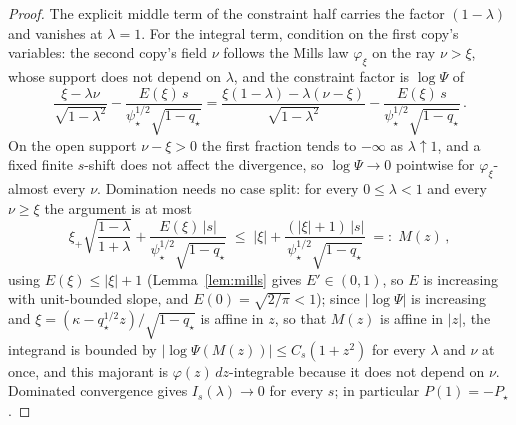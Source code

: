 \begin{proof}
The explicit middle term of the constraint half carries the factor
$(1-\lambda)$ and vanishes at $\lambda=1$.  For the integral term,
condition on the first copy's variables: the second copy's field
$\nu$ follows the Mills law $\varphi_\xi$ on the ray $\nu>\xi$,
whose support does not depend on $\lambda$, and the constraint
factor is $\log\Psi$ of
\[
\frac{\xi-\lambda\nu}{\sqrt{1-\lambda^2}}
-\frac{E(\xi)\,s}{\psi_\star^{1/2}\sqrt{1-q_\star}}
=\frac{\xi(1-\lambda)-\lambda(\nu-\xi)}{\sqrt{1-\lambda^2}}
-\frac{E(\xi)\,s}{\psi_\star^{1/2}\sqrt{1-q_\star}}\,.
\]
On the open support $\nu-\xi>0$ the first fraction tends to
$-\infty$ as $\lambda\uparrow1$, and a fixed finite $s$-shift does
not affect the divergence, so $\log\Psi\to0$ pointwise for
$\varphi_\xi$-almost every $\nu$.  Domination needs no case split:
for every $0\le\lambda<1$ and every $\nu\ge\xi$ the argument is at
most
\[
\xi_+\sqrt{\frac{1-\lambda}{1+\lambda}}
+\frac{E(\xi)\,|s|}{\psi_\star^{1/2}\sqrt{1-q_\star}}
\;\le\; |\xi| + \frac{(|\xi|+1)\,|s|}{\psi_\star^{1/2}
\sqrt{1-q_\star}} \;=:\; M(z)\,,
\]
using $E(\xi)\le|\xi|+1$ (Lemma~\ref{lem:mills} gives
$E'\in(0,1)$, so $E$ is increasing with unit-bounded slope, and
$E(0)=\sqrt{2/\pi}<1$); since $|\log\Psi|$ is increasing and
$\xi=(\kappa-q_\star^{1/2}z)/\sqrt{1-q_\star}$ is affine in $z$,
so that $M(z)$ is affine in $|z|$, the
integrand is bounded by $|\log\Psi(M(z))|\le C_s(1+z^2)$ for every
$\lambda$ and $\nu$ at once, and this majorant is
$\varphi(z)\,dz$-integrable because it does not depend on $\nu$.
Dominated convergence gives $I_s(\lambda)\to0$ for every
$s$; in particular $P(1)=-P_\star$.


\end{proof}
